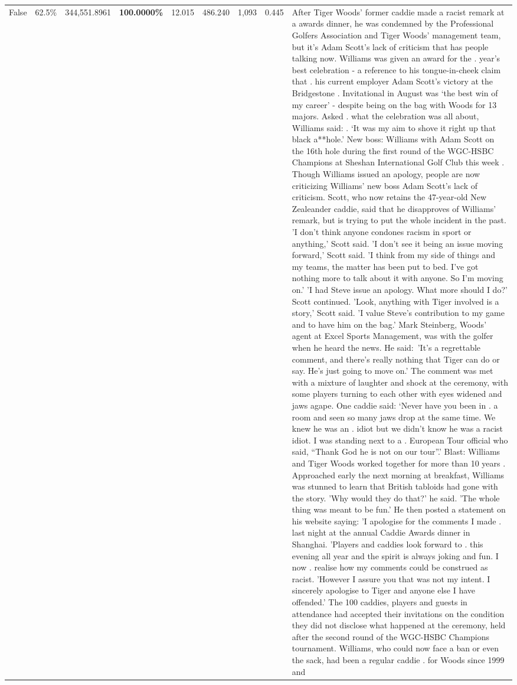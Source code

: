 \begin{table}[H]
\begin{tabular}{lllrlllll}
False & 62.5\% & 344,551.8961 & \bfseries \color{red} 100.0000\% & 12.015 & 486.240 & 1,093 & 0.445 & After Tiger Woods' former caddie made a racist remark at a awards dinner, he was condemned by the Professional Golfers Association and Tiger Woods' management team, but it's Adam Scott's lack of criticism that has people talking now. Williams was given an award for the . year’s best celebration - a reference to his tongue-in-cheek claim that . his current employer Adam Scott’s victory at the Bridgestone . Invitational in August was ‘the best win of my career’ - despite being on the bag with Woods for 13 majors. Asked . what the celebration was all about, Williams said: . ‘It was my aim to shove it right up that black a**hole.’ New boss: Williams with Adam Scott  on the 16th hole during the first round of the WGC-HSBC Champions at Sheshan International Golf Club this week . Though Williams issued an apology, people are now criticizing Williams' new boss Adam Scott's lack of criticism. Scott, who now retains the 47-year-old New Zealeander caddie, said that he disapproves of Williams' remark, but is trying to put the whole incident in the past. 'I don't think anyone condones racism in sport or anything,' Scott said. 'I don't see it being an issue moving forward,' Scott said. 'I think from my side of things and my teams, the matter has been put to bed. I've got nothing more to talk about it with anyone. So I'm moving on.' 'I had Steve issue an apology. What more should I do?' Scott continued. 'Look, anything with Tiger involved is a story,' Scott said. 'I value Steve's contribution to my game and to have him on the bag.' Mark Steinberg, Woods' agent at Excel Sports Management, was with the golfer when he heard the news. He said: 'It's a regrettable comment, and there's really nothing that Tiger can do or say. He's just going to move on.' The comment was met with a mixture of laughter and shock at the ceremony, with some players turning to each other with eyes widened and jaws agape. One caddie said: ‘Never have you been in . a room and seen so many jaws drop at the same time. We knew he was an . idiot but we didn’t know he was a racist idiot. I was standing next to a . European Tour official who said, “Thank God he is not on our tour”.’ Blast: Williams and Tiger Woods worked together for more than 10 years . Approached early the next morning at breakfast, Williams was stunned to learn that British tabloids had gone with the story. 'Why would they do that?' he said. 'The whole thing was meant to be fun.' He then posted a statement on his website saying: 'I apologise for the comments I made . last night at the annual Caddie Awards dinner in Shanghai. 'Players and caddies look forward to . this evening all year and the spirit is always joking and fun. I now . realise how my comments could be construed as racist. 'However I assure you that was not my intent. I sincerely apologise to Tiger and anyone else I have offended.' The 100 caddies, players and guests in attendance had accepted their invitations on the condition they did not disclose what happened at the ceremony, held after the second round of the WGC-HSBC Champions tournament. Williams, who could now face a ban or even the sack, had been a regular caddie . for Woods since 1999 and 
\end{tabular}
\end{table}
